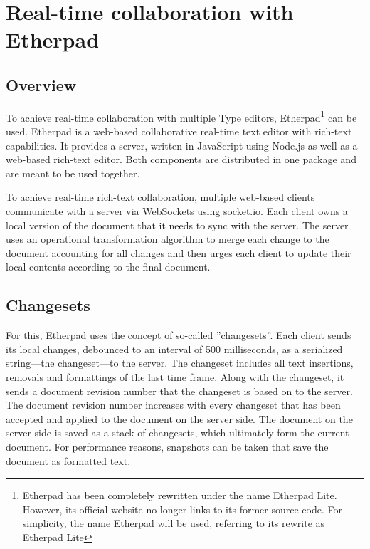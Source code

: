 \section{Real-time collaboration with Etherpad} 
\label{sec:etherpad}

\subsection{Overview}

To achieve real-time collaboration with multiple Type editors, Etherpad\footnote{Etherpad has been completely rewritten under the name Etherpad Lite. However, its official website no longer links to its former source code. For simplicity, the name Etherpad will be used, referring to its rewrite as Etherpad Lite} can be used. Etherpad is a web-based collaborative real-time text editor with rich-text capabilities. It provides a server, written in JavaScript using Node.js as well as a web-based rich-text editor. Both components are distributed in one package and are meant to be used together.

To achieve real-time rich-text collaboration, multiple web-based clients communicate with a server via WebSockets using socket.io. Each client owns a local version of the document that it needs to sync with the server. The server uses an operational transformation algorithm to merge each change to the document accounting for all changes and then urges each client to update their local contents according to the final document.

\subsection{Changesets}

For this, Etherpad uses the concept of so-called ''changesets''. Each client sends its local changes, debounced to an interval of 500 milliseconds, as a serialized string---the changeset---to the server. The changeset includes all text insertions, removals and formattings of the last time frame. Along with the changeset, it sends a document revision number that the changeset is based on to the server. The document revision number increases with every changeset that has been accepted and applied to the document on the server side. The document on the server side is saved as a stack of changesets, which ultimately form the current document. For performance reasons, snapshots can be taken that save the document as formatted text. 

